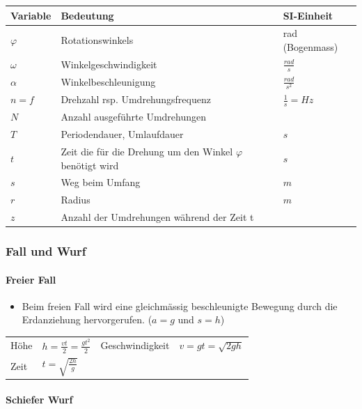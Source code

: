 \documentclass[
a4paper,
oneside,
landscape, 
8pt,
]{scrartcl}
\begin{document}
\begin{multicols*}{2}
\begin{tabbing}
	\begin{tabu} to \linewidth {l X l}
		Variable & Bedeutung & SI-Einheit \\
		\midrule
		$\varphi$ & Rotationswinkels  & rad (Bogenmass) \\ 
		$\omega$ & Winkelgeschwindigkeit & $\frac{rad}{s}$ \\
		$\alpha$ & Winkelbeschleunigung & $\frac{rad}{s^2}$ \\
		$n = f$ & Drehzahl rsp. Umdrehungsfrequenz & $\frac{1}{s} = Hz$ \\
		$N$ & Anzahl ausgeführte Umdrehungen & \\
		$T$ & Periodendauer, Umlaufdauer & $s$ \\
		$t$ & Zeit die für die Drehung um den Winkel $\varphi$ benötigt wird & $s$ \\
		$s$ & Weg beim Umfang & $m$ \\
		$r$ & Radius & $m$ \\
		$z$ & Anzahl der Umdrehungen während der Zeit t & \\
		\bottomrule
	\end{tabu}
\end{tabbing}


\clearpage


\subsubsection{Fall und Wurf}

\paragraph{Freier Fall}
\begin{itemize}
	\item Beim freien Fall wird eine gleichmässig beschleunigte Bewegung durch die Erdanziehung hervorgerufen. ($a = g$ und $s = h$)
\end{itemize}
\begin{tabbing}
	\begin{tabu} to \linewidth {l X l X}
		\toprule
		Höhe & $h = \frac{vt}{2} = \frac{gt^2}{2}$  &
		Geschwindigkeit & $v = gt = \sqrt{2gh}$ \\
		Zeit & $t = \sqrt{\frac{2h}{g}}$ & & \\
		\bottomrule
	\end{tabu}
\end{tabbing}


\paragraph{Schiefer Wurf}


\end{multicols*}
\end{document}
